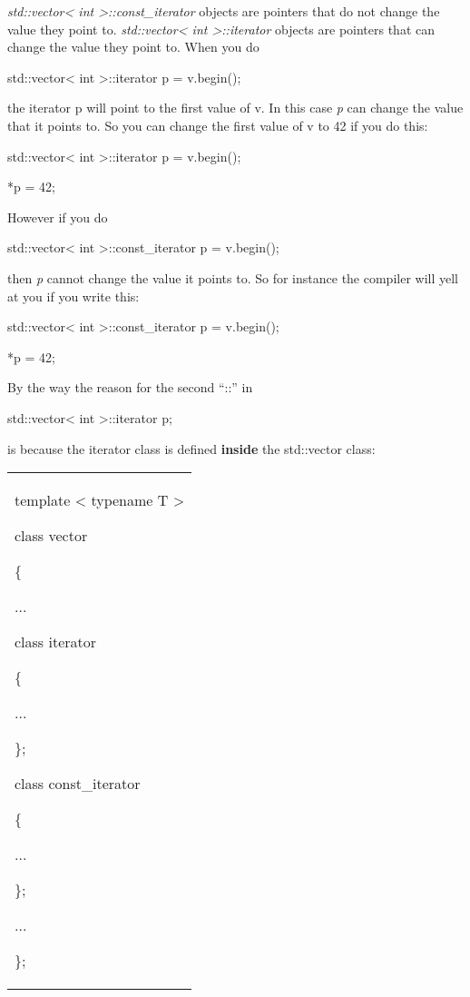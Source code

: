 \documentclass[
]{article}
\begin{document}
\emph{std::vector\textless{} int \textgreater::const\_iterator} objects
are pointers that do not change the value they point to.
\emph{std::vector\textless{} int \textgreater::iterator} objects are
pointers that can change the value they point to. When you do

std::vector\textless{} int \textgreater::iterator p = v.begin();

the iterator p will point to the first value of v. In this case \emph{p}
can change the value that it points to. So you can change the first
value of v to 42 if you do this:

std::vector\textless{} int \textgreater::iterator p = v.begin();

*p = 42;

However if you do

std::vector\textless{} int \textgreater::const\_iterator p = v.begin();

then \emph{p} cannot change the value it points to. So for instance the
compiler will yell at you if you write this:

std::vector\textless{} int \textgreater::const\_iterator p = v.begin();

*p = 42;

By the way the reason for the second ``::'' in

std::vector\textless{} int \textgreater::iterator p;

is because the iterator class is defined \textbf{inside} the std::vector
class:

\begin{longtable}[]{@{}
  >{\raggedright\arraybackslash}p{}@{}}
\toprule\noalign{}
 \\
\midrule\noalign{}
\endhead
\bottomrule\noalign{}
\endlastfoot
template \textless{} typename T \textgreater{}

class vector

\{

...

class iterator

\{

...

\};

class const\_iterator

\{

...

\};

...

\}; \\
\end{longtable}
\end{document}
